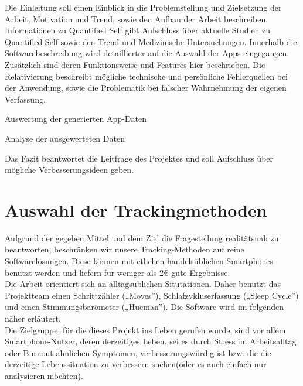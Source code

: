 Die Einleitung soll einen Einblick in die Problemstellung und Zielsetzung der Arbeit, Motivation und Trend, sowie den Aufbau der Arbeit beschreiben.
Informationen zu Quantified Self gibt Aufschluss über aktuelle Studien zu Quantified Self sowie den Trend und Medizinische Untersuchungen.
Innerhalb die Softwarebeschreibung wird detaillierter auf die Auswahl der Apps eingegangen.\\
Zusätzlich sind deren Funktionsweise und Features hier beschrieben.
Die Relativierung beschreibt mögliche technische und persönliche Fehlerquellen bei der Anwendung, sowie die Problematik bei falscher Wahrnehmung der eigenen Verfassung.


Auswertung der generierten App-Daten


Analyse der ausgewerteten Daten


Das Fazit beantwortet die Leitfrage des Projektes und soll Aufschluss über mögliche Verbesserungsideen geben.

\section{Auswahl der Trackingmethoden}
\label{ch:Einleitung:sec:AuswahlDerTrackingmethoden}

Aufgrund der gegeben Mittel und dem Ziel die Fragestellung realitätsnah zu beantworten, beschränken wir unsere Tracking-Methoden auf reine Softwarelösungen. 
Diese können mit etlichen handelsüblichen Smartphones benutzt werden und liefern für weniger als 2\euro{} gute Ergebnisse. \cite{web:TrackingResults} \cite{web:AppPreis} \\
Die Arbeit orientiert sich an alltagsüblichen Situtationen. 
Daher benutzt das Projektteam einen Schrittzähler („Moves”), Schlafzykluserfassung („Sleep Cycle”) und einen Stimmungsbarometer („Hueman”).
Die Software wird im folgenden näher erläutert. \\
Die Zielgruppe, für die dieses Projekt ins Leben gerufen wurde, sind vor allem Smartphone-Nutzer, deren derzeitiges Leben, sei es durch Stress im Arbeitsalltag oder Burnout-ähnlichen Symptomen, verbesserungswürdig ist bzw. die die derzeitige Lebenssituation zu verbessern suchen(oder es auch einfach nur analysieren möchten).  

